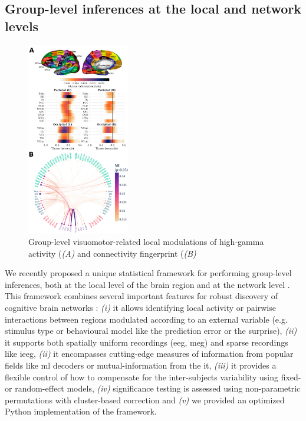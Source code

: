 \documentclass[a4paper,11pt]{article}
\begin{document}


\subsection{Group-level inferences at the local and network levels}

\begin{figure} %
    \centering
    \includegraphics[width=0.40\textwidth]{figures/report/combrisson_2022_group_level_col.png}
    \caption{Group-level visuomotor-related local modulations of high-gamma activity (\textit{(A)} and connectivity fingerprint (\textit{(B)}}
    \label{fig_group_level}
\end{figure}

We recently proposed a unique statistical framework for performing group-level inferences, both at the local level of the brain region and at the network level \citep{combrisson2022grouplevel}. This framework combines several important features for robust discovery of cognitive brain networks : \textit{(i)} it allows identifying local activity or pairwise interactions between regions modulated according to an external variable (e.g. stimulus type or behavioural model like the prediction error or the surprise), \textit{(ii)} it supports both spatially uniform recordings (\ac{eeg}, \ac{meg}) and sparse recordings like \ac{ieeg}, \textit{(ii)} it encompasses cutting-edge measures of information from popular fields like \ac{ml} decoders or mutual-information from the \ac{it}, \textit{(iii)} it provides a flexible control of how to compensate for the inter-subjects variability using fixed- or random-effect models, \textit{(iv)} significance testing is assessed using non-parametric permutations with cluster-based correction and \textit{(v)} we provided an optimized Python implementation of the framework. 
\end{document}
